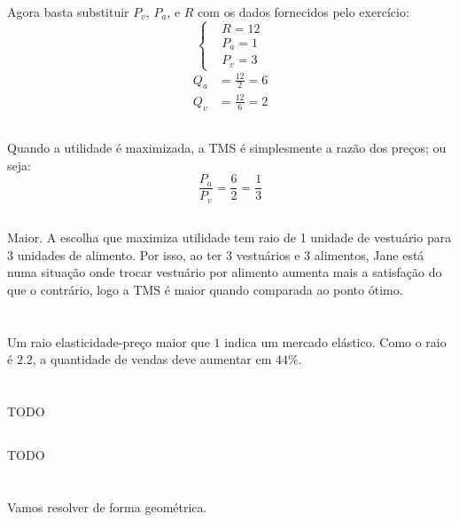 \documentclass{article}
\begin{document}
Agora basta substituir \(P_v\), \(P_a\), e \(R\) com os dados fornecidos pelo exercício:
\[
	\left\{
	\begin{aligned}
		 & R = 12  \\
		 & P_a = 1 \\
		 & P_v = 3
	\end{aligned}
	\right.
\]
\[
	\begin{aligned}
		Q_a & = \frac{12}{2} = 6 \\
		Q_v & = \frac{12}{6} = 2
	\end{aligned}
\]

\subsection{}
Quando a utilidade é maximizada, a TMS é simplesmente a razão dos preços; ou seja:
\[
	\frac{P_a}{P_v} = \frac{6}{2} = \frac{1}{3}
\]

\subsection{}
Maior. A escolha que maximiza utilidade tem raio de 1 unidade de vestuário para 3 unidades de alimento. Por isso, ao ter 3 vestuários e 3 alimentos, Jane está numa situação onde trocar vestuário por alimento aumenta mais a satisfação do que o contrário, logo a TMS é maior quando comparada ao ponto ótimo.

\section{}
Um raio elasticidade-preço maior que \(1\) indica um mercado elástico. Como o raio é \(2.2\), a quantidade de vendas deve aumentar em \(44\%\).

\section{}
\subsection{}
TODO
\subsection{}
TODO

\section{}
\subsection{}
Vamos resolver de forma geométrica.
\end{document}
